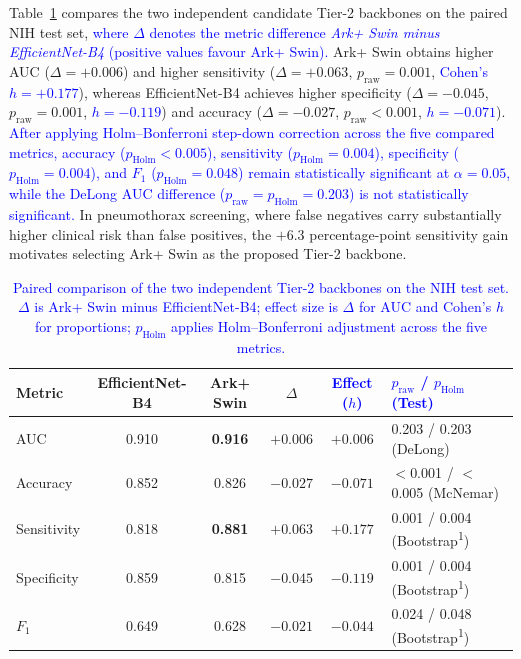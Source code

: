 \documentclass[diagnostics,article,submit,moreauthors]{Definitions/mdpi}
\newcommand{\rev}[1]{\textcolor{blue}{#1}}
\begin{document}
Table~\ref{tab:backbone} compares the two independent candidate Tier-2 backbones on the paired NIH test set, \rev{where $\Delta$ denotes the metric difference \emph{Ark+ Swin minus EfficientNet-B4} (positive values favour Ark+ Swin).} Ark+ Swin obtains higher AUC ($\Delta = +0.006$) and higher sensitivity ($\Delta = +0.063$, $p_{\text{raw}} = 0.001$, \rev{Cohen's $h = +0.177$}), whereas EfficientNet-B4 achieves higher specificity ($\Delta = -0.045$, $p_{\text{raw}} = 0.001$, \rev{$h = -0.119$}) and accuracy ($\Delta = -0.027$, $p_{\text{raw}} < 0.001$, \rev{$h = -0.071$}). \rev{After applying Holm--Bonferroni step-down correction across the five compared metrics, accuracy ($p_{\text{Holm}} < 0.005$), sensitivity ($p_{\text{Holm}} = 0.004$), specificity ($p_{\text{Holm}} = 0.004$), and $F_1$ ($p_{\text{Holm}} = 0.048$) remain statistically significant at $\alpha=0.05$, while the DeLong AUC difference ($p_{\text{raw}} = p_{\text{Holm}} = 0.203$) is not statistically significant.} In pneumothorax screening, where false negatives carry substantially higher clinical risk than false positives, the $+6.3$ percentage-point sensitivity gain motivates selecting Ark+ Swin as the proposed Tier-2 backbone.

\begin{table}[H]
\caption{\rev{Paired comparison of the two independent Tier-2 backbones on the NIH test set. $\Delta$ is Ark+ Swin minus EfficientNet-B4; effect size is $\Delta$ for AUC and Cohen's $h$ for proportions; $p_{\text{Holm}}$ applies Holm--Bonferroni adjustment across the five metrics.}}\label{tab:backbone}
\begin{tabular}{@{}lccccl@{}}
\toprule
Metric & EfficientNet-B4 & Ark+ Swin & $\Delta$ & \rev{Effect ($h$)} & \rev{$p_{\text{raw}}$ / $p_{\text{Holm}}$ (Test)}\\
\midrule
AUC & 0.910 & \textbf{0.916} & $+0.006$ & $+0.006$ & 0.203 / 0.203 (DeLong)\\
Accuracy & 0.852 & 0.826 & $-0.027$ & $-0.071$ & $<$0.001 / $<$0.005 (McNemar)\\
Sensitivity & 0.818 & \textbf{0.881} & $+0.063$ & $+0.177$ & 0.001 / 0.004 (Bootstrap\textsuperscript{1})\\
Specificity & 0.859 & 0.815 & $-0.045$ & $-0.119$ & 0.001 / 0.004 (Bootstrap\textsuperscript{1})\\
$F_1$ & 0.649 & 0.628 & $-0.021$ & $-0.044$ & 0.024 / 0.048 (Bootstrap\textsuperscript{1})\\
\bottomrule
\end{tabular}
\end{table}
\end{document}
